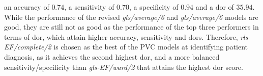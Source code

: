 an accuracy of $0.74$, a sensitivity of $0.70$, a specificity of $0.94$ and a \acrshort{dor} of $35.94$.
While the performance of the revised \textit{gls/average/6} and \textit{gls/average/6} models are good, 
they are still not as good as the performance of the top three performers in terms of \acrshort{dor}, which attain higher accuracy, sensitivity and \acrshort{dor}s.
Therefore, \textit{rls-EF/complete/2} is chosen as the best of the PVC models at identifying patient diagnosis, as it achieves the second highest \acrshort{dor}, 
and a more balanced sensitivity/specificity than \textit{gls-EF/ward/2} that attains the highest \acrshort{dor} score.

